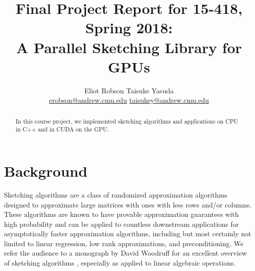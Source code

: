 \documentclass[12pt]{article}
\begin{document}
\title{
    \normalsize Final Project Report for 15-418, Spring 2018: \\
    \LARGE A Parallel Sketching Library for GPUs
}
\author{Eliot Robson \qquad Taisuke Yasuda\\ \small
\href{mailto:erobson@andrew.cmu.edu}{erobson@andrew.cmu.edu} \quad \href{mailto:taisukey@andrew.cmu.edu}{taisukey@andrew.cmu.edu}}

\maketitle

\begin{abstract}
	In this course project, we implemented sketching algorithms and applications on CPU in C++ and in CUDA on the GPU.
\end{abstract}

\section{Background}
Sketching algorithms are a class of randomized approximation algorithms designed to approximate large matrices with ones with less rows and/or columns. These algorithms are known to have provable approximation guarantees with high probability and can be applied to countless downstream applications for asymptotically faster approximation algorithms, including but most certainly not limited to linear regression, low rank approximations, and preconditioning. We refer the audience to a monograph by David Woodruff for an excellent overview of sketching algorithms \cite{woodruff2014sketching}, especially as applied to linear algebraic operations.
\end{document}
